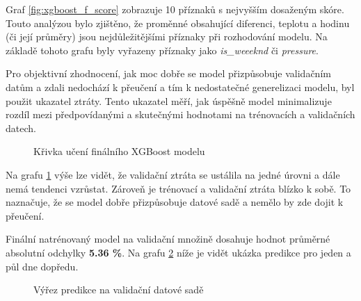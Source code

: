 \documentclass[FM,BP,fonts]{tulthesis}
\begin{document}
Graf \ref{fig:xgboost_f_score} zobrazuje 10 příznaků s nejvyšším dosaženým skóre. Touto analýzou bylo zjištěno, že proměnné obsahující diferenci, teplotu a hodinu (či její průměry) jsou nejdůležitějšími příznaky při rozhodování modelu. Na základě tohoto grafu byly vyřazeny příznaky jako \textit{is\_weeeknd} či \textit{pressure}.

Pro objektivní zhodnocení, jak moc dobře se model přizpůsobuje validačním datům a zdali nedochází k přeučení a tím k nedostatečné generelizaci modelu, byl použit ukazatel ztráty. Tento ukazatel měří, jak úspěšně model minimalizuje rozdíl mezi předpovídanými a skutečnými hodnotami na trénovacích a validačních datech.


\begin{figure}[htbp]
	\centering
	\caption{Křivka učení finálního XGBoost modelu}
	\label{fig:xgboost_learning_curve}
\end{figure}

Na grafu \ref{fig:xgboost_learning_curve} výše lze vidět, že validační ztráta se ustálila na jedné úrovni a dále nemá tendenci vzrůstat. Zároveň je trénovací a  validační ztráta blízko k sobě. To naznačuje, že se model dobře přizpůsobuje datové sadě a nemělo by zde dojit k přeučení.

Finální natrénovaný model na validační množině dosahuje hodnot průměrné absolutní odchylky \textbf{5.36 \%}. Na grafu \ref{fig:xgboost_predictions} níže je vidět ukázka predikce pro jeden a půl dne dopředu.

\begin{figure}[htbp]
	\centering
	\caption{Výřez predikce na validační datové sadě}
	\label{fig:xgboost_predictions}
\end{figure}
\end{document}
